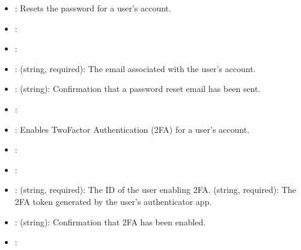 \documentclass[letterpaper,10pt,english]{sphinxmanual}
\begin{document}
\sphinxAtStartPar
{}
\begin{itemize}
\item {} 
\sphinxAtStartPar
{}: Resets the password for a user’s account.

\item {} 
\sphinxAtStartPar
{}: 

\item {} 
\sphinxAtStartPar
{}: 

\item {} 
\sphinxAtStartPar
{}:
\sphinxhyphen{}  (string, required): The email associated with the user’s account.

\item {} 
\sphinxAtStartPar
{}:
\sphinxhyphen{}  (string): Confirmation that a password reset email has been sent.

\item {} 
\sphinxAtStartPar
{}: 

\end{itemize}

\sphinxAtStartPar
{}
\begin{itemize}
\item {} 
\sphinxAtStartPar
{}: Enables Two\sphinxhyphen{}Factor Authentication (2FA) for a user’s account.

\item {} 
\sphinxAtStartPar
{}: 

\item {} 
\sphinxAtStartPar
{}: 

\item {} 
\sphinxAtStartPar
{}:
\sphinxhyphen{}  (string, required): The ID of the user enabling 2FA.
\sphinxhyphen{}  (string, required): The 2FA token generated by the user’s authenticator app.

\item {} 
\sphinxAtStartPar
{}:
\sphinxhyphen{}  (string): Confirmation that 2FA has been enabled.

\item {} 
\sphinxAtStartPar
{}: 

\end{itemize}
\end{document}

